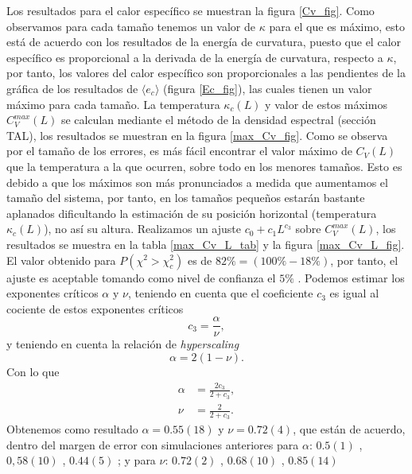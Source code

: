 Los resultados para el calor específico se muestran la figura
\ref{Cv_fig}. Como observamos para cada tamaño tenemos un valor de $\kappa$
para el que es máximo, esto está de acuerdo con los resultados de la energía
de curvatura, puesto que el calor específico es proporcional a la derivada de
la energía de curvatura, respecto a $\kappa$, por tanto, los valores del calor
específico son proporcionales a las pendientes de la gráfica de los resultados
de $\langle e_c\rangle$ (figura \ref{Ec_fig}), las cuales tienen un valor
máximo para cada tamaño. La temperatura $\kappa_c(L)$ y valor de estos máximos
$C_V^{max}(L)$ se calculan mediante el método de la densidad espectral (sección
TAL), los resultados se muestran en la figura \ref{max_Cv_fig}. Como se
observa por el tamaño de los errores, es más fácil encontrar el valor máximo
de $C_V(L)$ que la temperatura a la que ocurren, sobre todo en los menores
tamaños. Esto es debido a que los máximos son más pronunciados a medida que
aumentamos el tamaño del sistema, por tanto, en los tamaños pequeños estarán
bastante aplanados dificultando la estimación de su posición horizontal
(temperatura $\kappa_c(L)$), no así su altura. Realizamos un ajuste
$c_0+c_1L^{c_3}$ sobre $C_V^{max}(L)$, los resultados se muestra en la tabla
\ref{max_Cv_L_tab} y la figura \ref{max_Cv_L_fig}. El valor obtenido para $P(\chi^2>\chi_c^2)$ es de
$82\%=(100\%-18\%)$, por tanto, el ajuste es aceptable tomando como nivel de
confianza el $5\%$  . Podemos estimar los exponentes críticos $\alpha$ y $\nu$,
teniendo en cuenta que el coeficiente $c_3$ es igual al cociente de estos exponentes
críticos
\begin{equation*}
 c_3=\frac{\alpha}{\nu},
\end{equation*}
y teniendo en cuenta la relación de \textit{hyperscaling}
\begin{equation*}
\alpha=2(1-\nu).
\end{equation*}
Con lo que
\begin{align*}
\alpha&=\frac{2c_3}{2+c_3},\\
\nu&=\frac{2}{2+c_3}.
\end{align*}
Obtenemos como resultado $\alpha=0.55(18)$ y $\nu=0.72(4)$, que están de
acuerdo, dentro del margen de error con simulaciones anteriores para $\alpha$: $0.5(1)$
\cite{Bowick_flat_phase}, $0,58(10)$ \cite{Wheater_Critical_exponents},
$0.44(5)$ \cite{Renken_Scaling_behavior}; y para $\nu$: $0.72(2)$
\cite{Renken_Scaling_behavior}, $0.68(10)$ \cite{Wheater_Critical_exponents},
$0.85(14)$ \cite{Espriu:MCRG}

